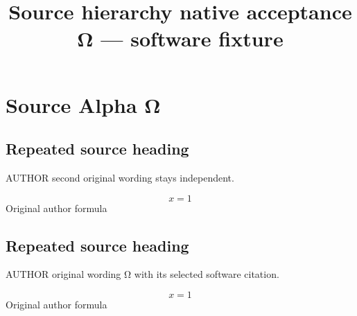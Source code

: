 \documentclass[11pt]{article}
\begin{document}
\title{Source hierarchy native acceptance Ω — software fixture}
\maketitle
\section{Source Alpha Ω}
\subsection{Repeated source heading}
AUTHOR second original wording stays independent. \citep{evidence_8a63870ad2cb494083c17595a2b3341c}

\begin{equation}
x=1
\end{equation}
Original author formula

\subsection{Repeated source heading}
AUTHOR original wording Ω with its selected software citation. \citep{evidence_8a63870ad2cb494083c17595a2b3341c}

\begin{equation}
x=1
\end{equation}
Original author formula



\end{document}
